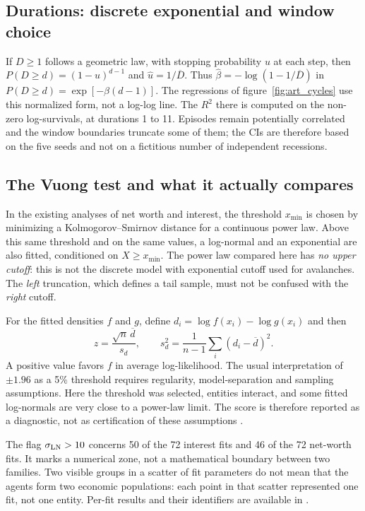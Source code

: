 \subsection{Durations: discrete exponential and window choice}
If $D\ge1$ follows a geometric law, with stopping probability $u$ at
each step, then $P(D\ge d)=(1-u)^{d-1}$ and
$\widehat u=1/\overline D$. Thus
$\widehat\beta=-\log(1-1/\overline D)$ in
$P(D\ge d)=\exp[-\beta(d-1)]$.
The regressions of figure~\ref{fig:art_cycles} use this
normalized form, not a log-log line. The $R^2$ there is computed
on the non-zero log-survivals, at durations 1 to 11. Episodes remain
potentially correlated and the window boundaries truncate some
of them; the CIs are therefore based on the five seeds and not on
a fictitious number of independent recessions.

\subsection{The Vuong test and what it actually compares}
In the existing analyses of net worth and interest, the threshold
$x_{\min}$ is chosen by minimizing a Kolmogorov--Smirnov
distance for a continuous power law. Above this same
threshold and on the same values, a log-normal and an
exponential are also fitted, conditioned on $X\ge x_{\min}$.
The power law compared here has \emph{no upper cutoff}: this
is not the discrete model with exponential cutoff used for avalanches.
The \emph{left} truncation, which defines a tail sample,
must not be confused with the \emph{right} cutoff.

For the fitted densities $f$ and $g$, define
$d_i=\log f(x_i)-\log g(x_i)$ and then
\[
 z=\frac{\sqrt n\,\overline d}{s_d},\qquad
 s_d^2=\frac1{n-1}\sum_i(d_i-\overline d)^2.
\]
A positive value favors $f$ in average log-likelihood.
The usual interpretation of $\pm1.96$ as a 5\%
threshold requires regularity, model-separation
and sampling assumptions. Here the threshold was selected, entities
interact, and some fitted log-normals are very close
to a power-law limit. The score is therefore reported as a diagnostic,
not as certification of these assumptions \cite{vuong}.

The flag $\sigma_{\rm LN}>10$ concerns 50 of the 72 interest
fits and 46 of the 72 net-worth fits. It marks a
numerical zone, not a mathematical boundary between two families.
Two visible groups in a scatter of fit parameters do not
mean that the agents form two economic populations:
each point in that scatter represented one fit, not one entity.
Per-fit results and their identifiers are available in
.

